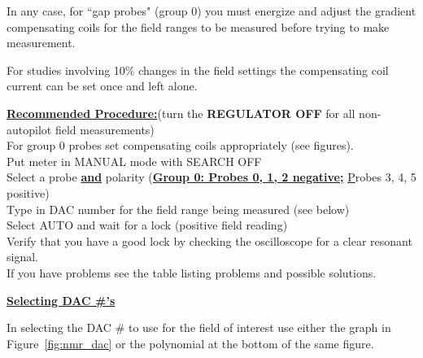 {In any case, for ``gap probes" (group 0) you must energize and adjust 
the gradient compensating coils for the field ranges to be measured before 
trying to make measurement.

For studies involving 
10\% changes in the field settings the compensating coil current can be 
set once and left alone.


\noindent\underline{\bf Recommended Procedure:}(turn the {\bf REGULATOR OFF} for all 
non-autopilot field measurements)\\
For group 0 probes set compensating coils appropriately (see figures).\\
Put meter in MANUAL mode with SEARCH OFF \\
Select a probe \underline{\bf and} polarity (\underline{\bf Group 0:  
Probes 0, 1, 2 negative;} {\underline Probes 3, 4, 5 positive}) \\
Type in DAC number for the field range being measured (see below) \\
Select AUTO and wait for a lock (positive field reading) \\
Verify that you have a good lock by checking the oscilloscope for a 
clear resonant signal. \\
If you have problems see the table listing problems and possible 
solutions.

\noindent\underline{\bf Selecting DAC \#'s}

In selecting the DAC \# to use for the field of interest use 
either the graph in Figure~\ref{fig:nmr_dac} or the polynomial at the bottom of the same figure.

}
